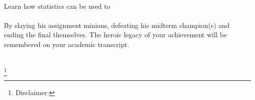 \documentclass[letterpaper,10pt,twoside,onecolumn,openany]{book}
\begin{document}
\frontmatter                           
\begin{titlepage}
    ~
    
    \newpage
    
    \begin{center}
        

        \large
        \vspace*{\fill}
        Learn how statistics can be used to 
        \\~\\
        By slaying his assignment minions, defeating his midterm champion(s) and ending the final themselves. The heroic legacy of your achievement will be remembered on your academic transcript.
        \\~\\
        \vspace*{\fill}

    \end{center}
    \let\thefootnote\relax\footnote{Disclaimer: }
\end{titlepage}
\tableofcontents
\mainmatter




\end{document}
